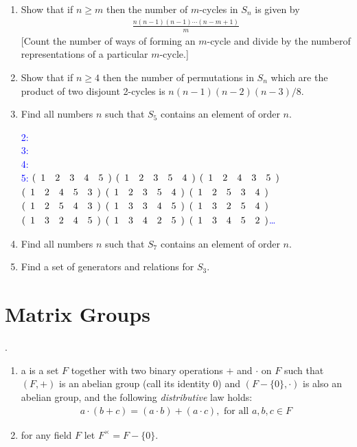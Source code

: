 \documentclass[10pt,a4paper]{report}
\newcommand{\BLUE}[1]{\textcolor{blue}{#1}}
\begin{document}
\begin{enumerate}
\item Show that if $n \ge m$ then the number of $m$-cycles in $S_n$ is given by
\begin{align*}
	\frac{n(n-1)(n-1)\cdots(n-m+1)}{m}
\end{align*}[Count the number of ways of forming an $m$-cycle and divide by the numberof representations of a particular $m$-cycle.]

\item Show that if $n\ge 4$ then the number of permutations in $S_n$ which are the product of two disjount 2-cycles is $n(n-1)(n-2)(n-3)/8$.

\item Find all numbers $n$ such that $S_5$ contains an element of order $n$.

\BLUE{
2:\\
3:\\
4:\\
5: $(\begin{array}{cccccccccc} 1&2&3&4&5 \end{array})$ $(\begin{array}{cccccccccc} 1&2&3&5&4 \end{array})$ $(\begin{array}{cccccccccc} 1&2&4&3&5 \end{array})$ $(\begin{array}{cccccccccc} 1&2&4&5&3 \end{array})$ $(\begin{array}{cccccccccc} 1&2&3&5&4 \end{array})$ $(\begin{array}{cccccccccc} 1&2&5&3&4 \end{array})$ $(\begin{array}{cccccccccc} 1&2&5&4&3 \end{array})$ $(\begin{array}{cccccccccc} 1&3&3&4&5 \end{array})$ $(\begin{array}{cccccccccc} 1&3&2&5&4 \end{array})$ $(\begin{array}{cccccccccc} 1&3&2&4&5 \end{array})$ $(\begin{array}{cccccccccc} 1&3&4&2&5 \end{array})$ $(\begin{array}{cccccccccc} 1&3&4&5&2 \end{array})$\dots
}

\item Find all numbers $n$ such that $S_7$ contains an element of order $n$.

\item Find a set of generators and relations for $S_3$.

\end{enumerate}

\section{Matrix Groups}

\begin{definition}[Field].\begin{enumerate}
	\item a  is a set $F$ together with two binary operations $+$ and $\cdot$ on $F$ such that $(F, +)$ is an abelian group (call its identity 0) and $(F-\{0\},\cdot)$ is also an abelian group, and the following \textit{distributive} law holds:
	\begin{align*}
		a\cdot(b+c)=(a\cdot b)+(a\cdot c), \text{  for all } a,b,c \in F
	\end{align*}
	
	\item for any field $F$ let $F^\times = F-\{0\}$.
\end{enumerate}
\end{definition}
\end{document}
